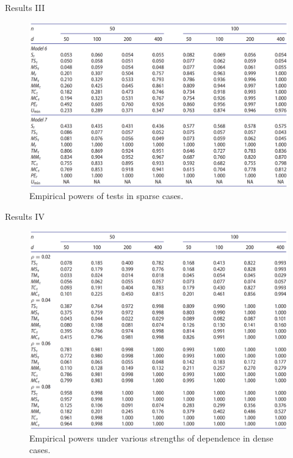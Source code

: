 \documentclass[
  ignorenonframetext,
]{beamer}
\begin{document}
\begin{frame}{Results III}
\label{results-iii}
\begin{figure}

{\centering \includegraphics[width=0.8\linewidth]{Figures/Table3} 

}

\caption{Empirical powers of tests in sparse cases.}\label{fig:Table 3}
\end{figure}
\end{frame}

\begin{frame}{Results IV}
\label{results-iv}
\begin{figure}

{\centering \includegraphics[width=0.8\linewidth,height=0.77\textheight]{Figures/Table4} 

}

\caption{Empirical powers under various strengths of dependence in dense cases.}\label{fig:Table 4}
\end{figure}
\end{frame}
\end{document}

